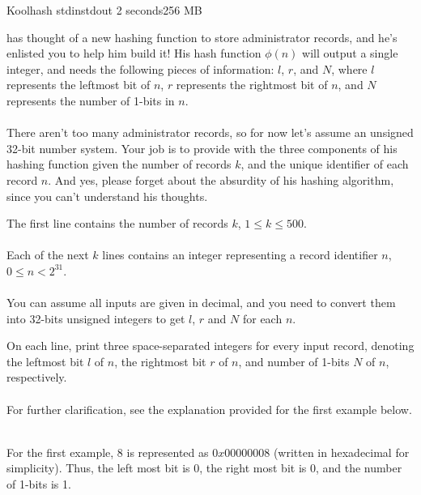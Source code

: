 \begin{problem}{Koolhash}
{stdin}{stdout}
{2 seconds}{256 MB}{}

\T has thought of a new hashing function to store administrator records, and he's enlisted you to help him build it! His hash function $\phi(n)$ will output a single integer, and needs the following pieces of information: $l$, $r$, and $N$, where $l$ represents the leftmost bit of  $n$, $r$ represents the rightmost bit of $n$, and $N$ represents the number of 1-bits in $n$. \\ \\
There aren't too many administrator records, so for now let's assume an unsigned 32-bit number system. Your job is to provide \T with the three components of his hashing function given the number of records $k$, and the unique identifier of each record $n$. And yes, please forget about the absurdity of his hashing algorithm, since you can't understand his thoughts.

\InputFile
The first line contains the number of records $k$, $1 \leq k \leq 500$. \\ \\
Each of the next $k$ lines contains an integer representing a record identifier $n$, $0 \leq n < 2^{31}$.\\ \\
You can assume all inputs are given in decimal, and you need to convert them into 32-bits unsigned integers to get $l$, $r$ and $N$ for each $n$.

\OutputFile
On each line, print three space-separated integers for every input record, denoting the leftmost bit $l$ of $n$, the rightmost bit $r$ of $n$, and number of 1-bits $N$ of $n$, respectively. \\ \\

For further clarification, see the explanation provided for the first example below.
\Examples

\begin{example}
%
\end{example}

\begin{example}
%
\end{example} \\
\Explanation
For the first example, $8$ is represented as $0x00000008$ (written in hexadecimal for simplicity). Thus, the left most bit is 0, the right most bit is 0, and the number of 1-bits is 1.
\end{problem}
